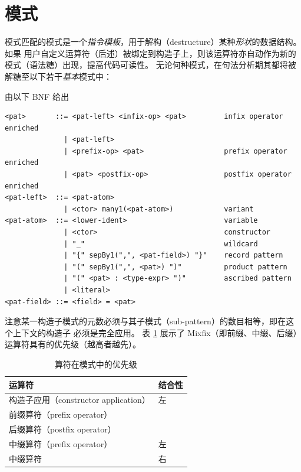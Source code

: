 \section{模式}
模式匹配的模式是一个\emph{指令模板}，用于解构（destructure）某种\emph{形状}的数据结构。如果
用户自定义运算符（后述）被绑定到构造子上，则该运算符亦自动作为新的模式（语法糖）出现，提高代码可读性。
无论何种模式，在句法分析期其都将被解糖至以下若干\emph{基本}模式中：
\begin{definition}[模式] 由以下 BNF 给出
\begin{verbatim}
<pat>       ::= <pat-left> <infix-op> <pat>         infix operator enriched
              | <pat-left>
              | <prefix-op> <pat>                   prefix operator enriched
              | <pat> <postfix-op>                  postfix operator enriched
<pat-left>  ::= <pat-atom>
              | <ctor> many1(<pat-atom>)            variant
<pat-atom>  ::= <lower-ident>                       variable
              | <ctor>                              constructor
              | "_"                                 wildcard
              | "{" sepBy1(",", <pat-field>) "}"    record pattern
              | "(" sepBy1(",", <pat>) ")"          product pattern
              | "(" <pat> : <type-expr> ")"         ascribed pattern
              | <literal>
<pat-field> ::= <field> = <pat>
\end{verbatim}
\end{definition}
注意某一构造子模式的元数必须与其子模式（sub-pattern）的数目相等，即在这个上下文的构造子
必须是完全应用。
表 \ref{tab:patoperator-prec} 展示了 Mixfix（即前缀、中缀、后缀）运算符具有的优先级（越高者越先）。
\begin{table}[ht]
  \centering
  \caption{算符在模式中的优先级}\label{tab:patoperator-prec}
  \begin{tabular}{@{}ll@{}}
    \toprule
    \textbf{运算符}                & \textbf{结合性} \\ \midrule
    构造子应用（constructor application） & 左          \\
    前缀算符（prefix operator）         &               \\
    后缀算符（postfix operator）       &               \\
    中缀算符（prefix operator）         & 左          \\
    中缀算符          & 右         \\ \bottomrule
  \end{tabular}
\end{table}

